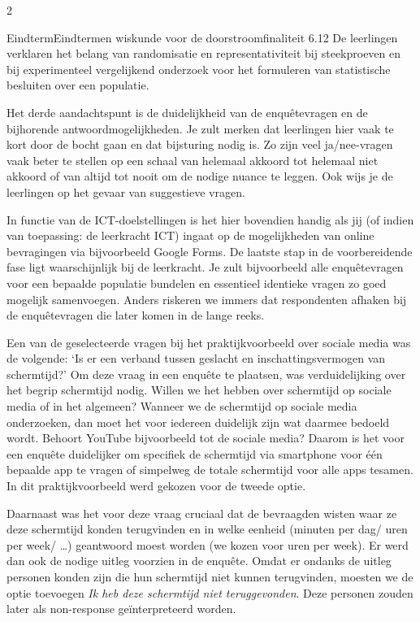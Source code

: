\begin{multicols}{2}
    \begin{kader}{Eindterm}{Eindtermen wiskunde voor de doorstroomfinaliteit}
            6.12 De leerlingen verklaren het belang van randomisatie en representativiteit bij steekproeven en bij experimenteel vergelijkend onderzoek voor het formuleren van statistische besluiten over een populatie.
    \end{kader}

Het derde aandachtspunt is de duidelijkheid van de enqu\^etevragen en de bijhorende antwoordmogelijkheden. Je zult merken dat leerlingen hier vaak te kort door de bocht gaan en dat bijsturing nodig is. Zo zijn veel ja/nee-vragen vaak beter te stellen op een schaal van helemaal akkoord tot helemaal niet akkoord of van altijd tot nooit om de nodige nuance te leggen. Ook wijs je de leerlingen op het gevaar van suggestieve vragen.

In functie van de ICT-doelstellingen is het hier bovendien handig als jij (of indien van toepassing: de leerkracht ICT) ingaat op de mogelijkheden van online bevragingen via bijvoorbeeld Google Forms. De laatste stap in de voorbereidende fase ligt waarschijnlijk bij de leerkracht. Je zult bijvoorbeeld alle enqu\^etevragen voor een bepaalde populatie bundelen en essentieel identieke vragen zo goed mogelijk samenvoegen. Anders riskeren we immers dat respondenten afhaken bij de enqu\^etevragen die later komen in de lange reeks. 

Een van de geselecteerde vragen bij het praktijkvoorbeeld over sociale media was de volgende: `Is er een verband tussen geslacht en inschattingsvermogen van schermtijd?' Om deze vraag in een enqu\^ete te plaatsen, was  verduidelijking over het begrip schermtijd nodig. Willen we het hebben over schermtijd op sociale media of in het algemeen? Wanneer we de schermtijd op sociale media onderzoeken, dan moet het voor iedereen duidelijk zijn wat daarmee bedoeld wordt. Behoort YouTube bijvoorbeeld tot de sociale media? Daarom is het voor een enqu\^ete duidelijker om specifiek de schermtijd via smartphone voor \'e\'en bepaalde app te vragen of simpelweg de totale schermtijd voor alle apps tesamen. In dit praktijkvoorbeeld werd gekozen voor de tweede optie. 
    
Daarnaast was het voor deze vraag cruciaal dat de bevraagden wisten waar ze deze schermtijd konden terugvinden en in welke eenheid (minuten per dag/ uren per week/ \ldots) geantwoord moest worden (we kozen voor uren per week). Er werd dan ook de nodige uitleg voorzien in de enqu\^ete. Omdat er ondanks de uitleg personen konden zijn die hun schermtijd niet kunnen terugvinden, moesten we de optie toevoegen \emph{Ik heb deze schermtijd niet teruggevonden}. Deze personen zouden later als non-response ge\"interpreteerd worden. 
    

\end{multicols}
